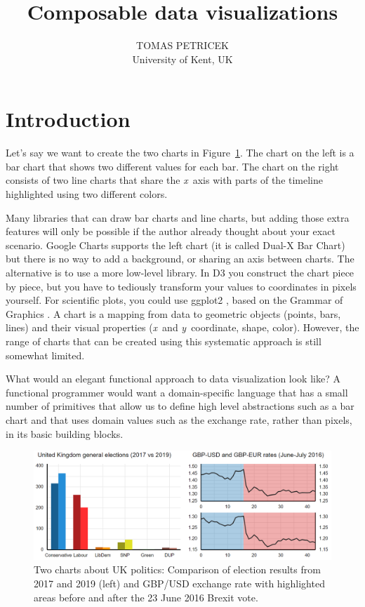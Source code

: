 \documentclass{jfp}
\title{Composable data visualizations}
\author[Tomas Petricek]{TOMAS PETRICEK\\
       University of Kent, UK\\
       \email{t.petricek@kent.ac.uk}}
\newcommand{\X}{\emph{x}\ }
\newcommand{\Y}{\emph{y}\ }
\begin{document}
\maketitle[f]



\section{Introduction}
Let's say we want to create the two charts in Figure~\ref{fig:charts}. The chart on the left is
a bar chart that shows two different values for each bar. The chart on the right consists of two
line charts that share the \X axis with parts of the timeline highlighted using two different colors.

Many libraries that can draw bar charts and line charts, but adding those extra
features will only be possible if the author already thought about your exact scenario.
Google Charts \cite{gcharts} supports the left chart (it is called Dual-X Bar Chart) but there is no
way to add a background, or sharing an axis between charts. The alternative is to use a more
low-level library. In D3 \cite{d3} you construct the chart piece by piece, but you have to
tediously transform your values to coordinates in pixels yourself. For scientific plots,
you could use ggplot2 \cite{ggplot2}, based on the Grammar of Graphics \cite{grammar}.
A chart is a mapping from data to geometric objects (points, bars, lines) and their visual
properties (\X and \Y coordinate, shape, color). However, the range of charts that can be
created using this systematic approach is still somewhat limited.

What would an elegant functional approach to data visualization look like? A functional programmer
would want a domain-specific language that has a small number of primitives that allow us to define
high level abstractions such as a bar chart and that uses domain values such as the exchange
rate, rather than pixels, in its basic building blocks.

\begin{figure}[h]
  \includegraphics[scale=0.57]{figures/charts}
  \vspace{0.25em}
  \caption{Two charts about UK politics: Comparison of election results from 2017 and 2019 (left)
    and GBP/USD exchange rate with highlighted areas before and after the 23 June 2016 Brexit vote.}
  \label{fig:charts}
\end{figure}
\end{document}
